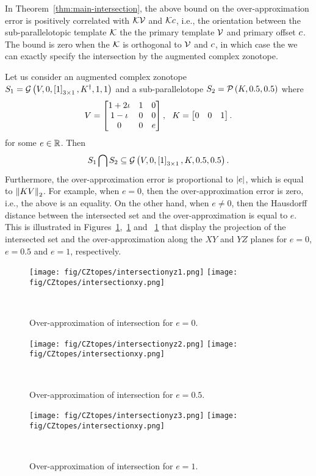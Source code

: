 %
In Theorem~\ref{thm:main-intersection}, the above bound on the over-approximation error is positively
correlated with
$\mathcal{K}\mathcal{V}$ and $\mathcal{K}c$, i.e., the orientation between the
sub-parallelotopic template $\mathcal{K}$ the the primary template $\mathcal{V}$
and primary offset $c$.  The bound is zero when the $\mathcal{K}$ is orthogonal to
$\mathcal{V}$ and $c$, in which case the we can exactly specify the
intersection by the augmented complex zonotope.
%
\begin{example}
Let us consider an augmented complex zonotope\\
${S_1=\mathcal{G}\left(V,0,\left[1\right]_{3\times 1},{K}^\dagger,1,1\right)}$ and a
sub-parallelotope $S_2=\mathcal{P}\left(K,0.5,0.5\right)$ where
%
\[
V = \left[\begin{matrix}
1+2\iota & 1 & 0\\
1-\iota & 0 & 0\\
0 & 0 & e
\end{matrix}\right],~~
K = \left[\begin{matrix}0 & 0 & 1\end{matrix}\right].
\]
%
for some $e\in \mathbb{R}$.  Then
%
\[
S_1\bigcap S_2\subseteq \mathcal{G}\left(V,0,\left[1\right]_{3\times 1},K,0.5,0.5\right).
\]
%
Furthermore, the over-approximation error is proportional to
$\left|e\right|$, which is equal to $\left\|KV\right\|_2$.  For example, when
$e=0$, then the over-approximation error is zero, i.e., the above is
an equality.  On the other hand, when $e\neq 0$, then the Hausdorff
distance between the intersected set and the over-approximation is
equal to $e$.  This is illustrated in
Figures~\ref{fig:overapp1},~\ref{fig:overapp1} and ~\ref{fig:overapp1}
that display the projection of the intersected set and the
over-approximation along the $XY$ and $YZ$ planes for ${e=0}$, $e=0.5$
and $e=1$, respectively.
\end{example}
%
%
\begin{figure}
\center
\texttt{[image: fig/CZtopes/intersectionyz1.png]}
\texttt{[image: fig/CZtopes/intersectionxy.png]}
\caption{Over-approximation of intersection for $e=0$.}~\label{fig:overapp1}
\end{figure}
%
%
\begin{figure}
\center
\texttt{[image: fig/CZtopes/intersectionyz2.png]}
\texttt{[image: fig/CZtopes/intersectionxy.png]}
\caption{Over-approximation of intersection for $e=0.5$.}~\label{fig:overapp2}
\end{figure}
%
\begin{figure}
\center
\texttt{[image: fig/CZtopes/intersectionyz3.png]}
\texttt{[image: fig/CZtopes/intersectionxy.png]}
\caption{Over-approximation of intersection for $e=1$.}~\label{fig:overapp3}
\end{figure}
%
